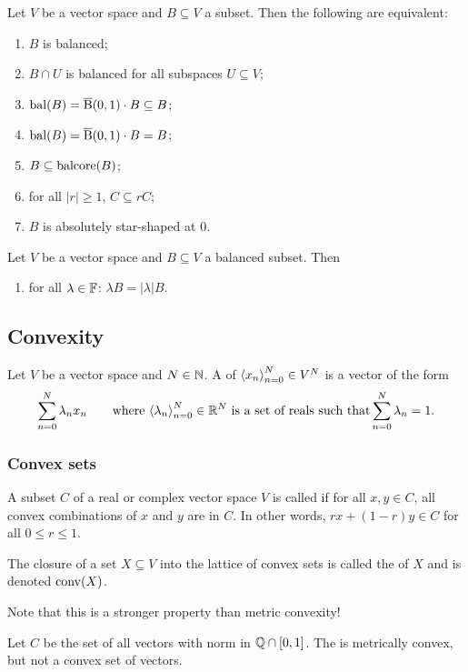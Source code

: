\begin{lemma}
Let $V$ be a vector space and $B\subseteq V$ a subset. Then the following are equivalent:
\begin{enumerate}
\item $B$ is balanced;
\item $B\cap U$ is balanced for all subspaces $U\subseteq V$;
\item $\operatorname{bal}(B) = \operatorname{\overline{B}}(0,1)\cdot B \subseteq B$;
\item $\operatorname{bal}(B) = \operatorname{\overline{B}}(0,1)\cdot B = B$;
\item $B\subseteq \operatorname{balcore}(B)$;
\item for all $|r|\geq 1$, $C\subseteq rC$;
\item $B$ is absolutely star-shaped at $0$.
\end{enumerate}
\end{lemma}

\begin{lemma} \label{balancedLemma}
Let $V$ be a vector space and $B\subseteq V$ a balanced subset. Then
\begin{enumerate}
\item for all $\lambda\in \mathbb{F}$: $\lambda B = |\lambda| B$.
\end{enumerate}
\end{lemma}



\subsection{Convexity}
\begin{definition}
Let $V$ be a vector space and $N\in \mathbb{N}$. A  of $\left\langle x_n \right\rangle_{n=0}^N \in V^N$ is a vector of the form
\[ \sum_{n=0}^N \lambda_n x_n \qquad \text{where $\left\langle \lambda_n \right\rangle_{n=0}^N \in \mathbb{R}^N$ is a set of reals such that} \sum_{n=0}^N \lambda_n = 1. \]
\end{definition}

\subsubsection{Convex sets}
\begin{definition}
A subset $C$ of a real or complex vector space $V$ is called  if for all $x,y\in C$, all convex combinations of $x$ and $y$ are in $C$. In other words, $rx + (1-r)y\in C$ for all $0\leq r \leq 1$.

The closure of a set $X\subseteq V$ into the lattice of convex sets is called the  of $X$ and is denoted $\operatorname{conv}(X)$.
\end{definition}
Note that this is a stronger property than metric convexity!
\begin{example}
Let $C$ be the set of all vectors with norm in $\mathbb{Q}\cap [0,1]$. The is metrically convex, but not a convex set of vectors.
\end{example}

